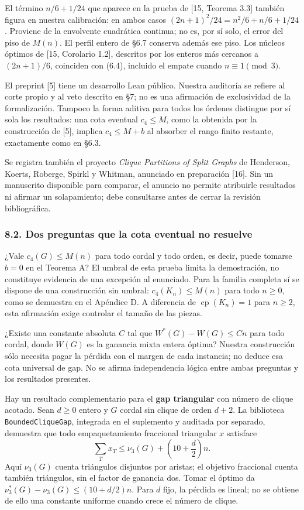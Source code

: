 \documentclass[spanish,11pt,a4paper]{article}
\begin{document}
El término \(n/6+1/24\) que aparece en la prueba de {[}15, Teorema 3.3{]} también figura en nuestra calibración: en ambos casos \((2n+1)^2/24=n^2/6+n/6+1/24\). Proviene de la envolvente cuadrática continua; no es, por sí solo, el error del piso de \(M(n)\). El perfil entero de §6.7 conserva además ese piso. Los núcleos óptimos de {[}15, Corolario 1.2{]}, descritos por los enteros más cercanos a \((2n+1)/6\), coinciden con (6.4), incluido el empate cuando \(n\equiv1\pmod3\).

El preprint {[}5{]} tiene un desarrollo Lean público. Nuestra auditoría se refiere al corte propio y al veto descrito en §7; no es una afirmación de exclusividad de la formalización. Tampoco la forma aditiva para todos los órdenes distingue por sí sola los resultados: una cota eventual \(c_4\le M\), como la obtenida por la construcción de {[}5{]}, implica \(c_4\le M+b\) al absorber el rango finito restante, exactamente como en §6.3.

Se registra también el proyecto \emph{Clique Partitions of Split Graphs} de Henderson, Koerts, Roberge, Spirkl y Whitman, anunciado en preparación {[}16{]}. Sin un manuscrito disponible para comparar, el anuncio no permite atribuirle resultados ni afirmar un solapamiento; debe consultarse antes de cerrar la revisión bibliográfica.

\subsubsection{8.2. Dos preguntas que la cota eventual no resuelve}\label{dos-preguntas-que-la-cota-eventual-no-resuelve}

¿Vale \(c_4(G)\le M(n)\) para todo cordal y todo orden, es decir, puede tomarse \(b=0\) en el Teorema A? El umbral de esta prueba limita la demostración, no constituye evidencia de una excepción al enunciado. Para la familia completa sí se dispone de una construcción sin umbral: \(c_4(K_n)\le M(n)\) para todo \(n\ge0\), como se demuestra en el Apéndice D. A diferencia de \(\operatorname{cp}(K_n)=1\) para \(n\ge2\), esta afirmación exige controlar el tamaño de las piezas.

¿Existe una constante absoluta \(C\) tal que \(W^*(G)-W(G)\le Cn\) para todo cordal, donde \(W(G)\) es la ganancia mixta entera óptima? Nuestra construcción sólo necesita pagar la pérdida con el margen de cada instancia; no deduce esa cota universal de gap. No se afirma independencia lógica entre ambas preguntas y los resultados presentes.

Hay un resultado complementario para el \textbf{gap triangular} con número de clique acotado. Sean \(d\ge0\) entero y \(G\) cordal sin clique de orden \(d+2\). La biblioteca \nolinkurl{BoundedCliqueGap}, integrada en el suplemento y auditada por separado, demuestra que todo empaquetamiento fraccional triangular \(x\) satisface \[
\sum_T x_T\le \nu_3(G)+\left(10+\frac d2\right)n.
\tag{8.1a}
\] Aquí \(\nu_3(G)\) cuenta triángulos disjuntos por aristas; el objetivo fraccional cuenta también triángulos, sin el factor de ganancia dos. Tomar el óptimo da \(\nu_3^*(G)-\nu_3(G)\le(10+d/2)n\). Para \(d\) fijo, la pérdida es lineal; no se obtiene de ello una constante uniforme cuando crece el número de clique.
\end{document}

